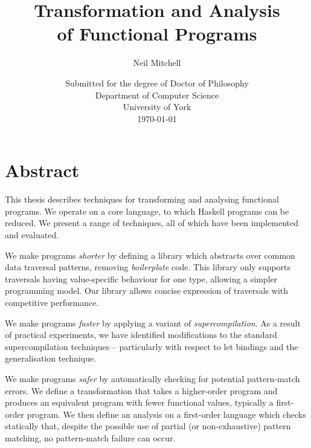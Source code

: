 
\title{Transformation and Analysis \\ of Functional Programs}
\author{Neil Mitchell}
\date{\normalsize{
    \vspace{20mm}
    Submitted for the degree of Doctor of Philosophy \\
    \vspace{10mm}
    Department of Computer Science \\
    University of York \\
    \today}}

\maketitle

\setcounter{page}{2}

\chapter*{Abstract}



This thesis describes techniques for transforming and analysing functional programs. We operate on a core language, to which Haskell programs can be reduced. We present a range of techniques, all of which have been implemented and evaluated.

We make programs \textit{shorter} by defining a library which abstracts over common data traversal patterns, removing \textit{boilerplate} code. This library only supports traversals having value-specific behaviour for one type, allowing a simpler programming model. Our library allows concise expression of traversals with competitive performance.

We make programs \textit{faster} by applying a variant of \textit{supercompilation}. As a result of practical experiments, we have identified modifications to the standard supercompilation techniques -- particularly with respect to let bindings and the generalisation technique.

We make programs \textit{safer} by automatically checking for potential pattern-match errors. We define a transformation that takes a higher-order program and produces an equivalent program with fewer functional values, typically a first-order program. We then define an analysis on a first-order language which checks statically that, despite the possible use of partial (or non-exhaustive) pattern matching, no pattern-match failure can occur.


